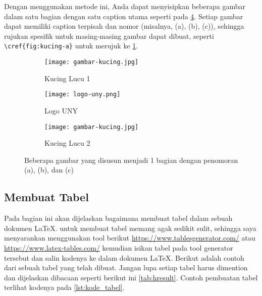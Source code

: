 Dengan menggunakan metode ini, Anda dapat menyisipkan beberapa gambar dalam satu bagian dengan satu caption utama seperti pada \cref{fig:kucingdanUNY}. Setiap gambar dapat memiliki caption terpisah dan nomor (misalnya, (a), (b), (c)), sehingga rujukan spesifik untuk masing-masing gambar dapat dibuat, seperti \texttt{\textbackslash cref\{fig:kucing-a\}} untuk merujuk ke \cref{fig:kucing-a}.

\begin{figure}
    \centering
    \begin{subfigure}[b]{0.3\textwidth}
        \centering
        \texttt{[image: gambar-kucing.jpg]}
        \caption{Kucing Lucu 1}
        \label{fig:kucing-a}
    \end{subfigure}
    \hfill
    \begin{subfigure}[b]{0.3\textwidth}
        \centering
        \texttt{[image: logo-uny.png]}
        \caption{Logo UNY}
        \label{fig:logo-uny-b}
    \end{subfigure}
    \hfill
    \begin{subfigure}[b]{0.3\textwidth}
        \centering
        \texttt{[image: gambar-kucing.jpg]}
        \caption{Kucing Lucu 2}
        \label{fig:kucing-c}
    \end{subfigure}
    \caption{Beberapa gambar yang disusun menjadi 1 bagian dengan penomoran (a), (b), dan (c)}
    \label{fig:kucingdanUNY}
\end{figure}

\subsection{Membuat Tabel}
Pada bagian ini akan dijelaskan bagaimana membuat tabel dalam sebuah dokumen \LaTeX. untuk membuat tabel memang agak sedikit sulit, sehingga saya menyarankan menggunakan tool berikut \url{https://www.tablesgenerator.com/} atau \url{https://www.latex-tables.com/} kemudian isikan tabel pada tool generator tersebut dan salin kodenya ke dalam dokumen \LaTeX. Berikut adalah contoh dari sebuah tabel yang telah dibuat. Jangan lupa setiap tabel harus dimention dan dijelaskan dibacaan seperti berikut ini \cref{tab:hresult}. Contoh pembuatan tabel terlihat kodenya pada \cref{lst:kode_tabel}.


